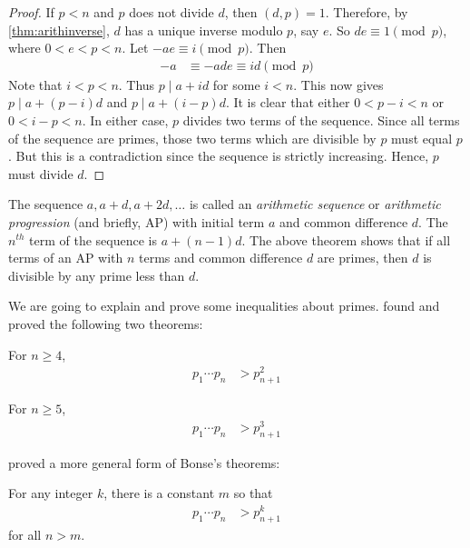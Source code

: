 \documentclass{subfiles}
\begin{document}
	\begin{proof}
		If $p<n$ and $p$ does not divide $d$, then $(d,p)=1$. Therefore, by \autoref{thm:arithinverse}, $d$ has a unique inverse modulo $p$, say $e$. So $de\equiv1\pmod p$, where $0<e<p<n$. Let $-ae \equiv i \pmod p$. Then
			\begin{align*}
				-a & \equiv -ade \equiv id \pmod p
			\end{align*}
		Note that $i<p<n$. Thus $p\mid a+id$ for some $i<n$. This now gives $p\mid a+(p-i)d$ and $p\mid a+(i-p)d$. It is clear that either $0<p-i<n$ or $0<i-p<n$. In either case, $p$ divides two terms of the sequence. Since all terms of the sequence are primes, those two terms which are divisible by $p$ must equal $p$. But this is a contradiction since the sequence is strictly increasing. Hence, $p$ must divide $d$.
	\end{proof}

	\begin{remark}
		The sequence $a, a+d, a+2d, \ldots$ is called an \textit{arithmetic sequence} or \textit{arithmetic progression} (and briefly, AP) with initial term $a$ and common difference $d$. The $n^{th}$ term of the sequence is $a+(n-1)d$. The above theorem shows that if all terms of an AP with $n$ terms and common difference $d$ are primes, then $d$ is divisible by any prime less than $d$.
	\end{remark}

	We are going to explain and prove some inequalities about primes. \textcite{bonse_1907} found and proved the following two theorems:
	\begin{theorem}\label{thm:bonse1}
		For $n\geq 4$,
			\begin{align*}
				p_1\cdots p_n
					& >p_{n+1}^2
			\end{align*}
	\end{theorem}

	\begin{theorem}\label{thm:bonse2}
		For $n \geq 5$,
			\begin{align*}
				p_1\cdots p_n
					& >p_{n+1}^3
			\end{align*}
	\end{theorem}

	\textcite{posa_1960} proved a more general form of Bonse's theorems:
	\begin{theorem}
		\label{thm:posa}
		For any integer $k$, there is a constant $m$ so that
			\begin{align*}
				p_1\cdots p_n
					& >p_{n+1}^k
			\end{align*}
		for all $n>m$.
	\end{theorem}
\end{document}

